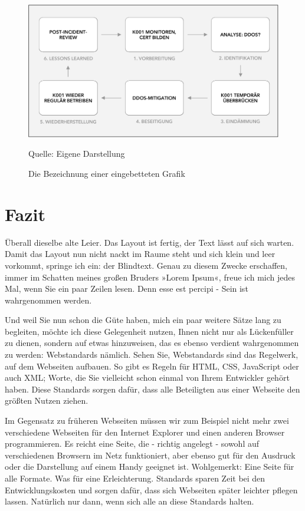 \documentclass[ngerman, 11pt, a4paper]{article}
\renewcommand{\footnotesize}{\linespread{1}\fontsize{10pt}{12pt}\selectfont}
\renewcommand{\footnotesize}{\linespread{1}\fontsize{10pt}{12pt}\selectfont}
\newcommand{\source}[1]{\caption*{\footnotesize Quelle: {#1}} }
\begin{document}
\begin{figure}[H]
\centering
\caption{Die Bezeichnung einer eingebetteten Grafik}
\label{fig:chasm}
\includegraphics[width=\textwidth]{graphic}
\source{Eigene Darstellung}
\end{figure} 

\section{Fazit}

Überall dieselbe alte Leier. Das Layout ist fertig, der Text lässt auf sich warten. Damit das Layout nun nicht nackt im Raume steht und sich klein und leer vorkommt, springe ich ein: der Blindtext. Genau zu diesem Zwecke erschaffen, immer im Schatten meines großen Bruders »Lorem Ipsum«, freue ich mich jedes Mal, wenn Sie ein paar Zeilen lesen. Denn esse est percipi - Sein ist wahrgenommen werden.

Und weil Sie nun schon die Güte haben, mich ein paar weitere Sätze lang zu begleiten, möchte ich diese Gelegenheit nutzen, Ihnen nicht nur als Lückenfüller zu dienen, sondern auf etwas hinzuweisen, das es ebenso verdient wahrgenommen zu werden: Webstandards nämlich. Sehen Sie, Webstandards sind das Regelwerk, auf dem Webseiten aufbauen. So gibt es Regeln für HTML, CSS, JavaScript oder auch XML; Worte, die Sie vielleicht schon einmal von Ihrem Entwickler gehört haben. Diese Standards sorgen dafür, dass alle Beteiligten aus einer Webseite den größten Nutzen ziehen.

Im Gegensatz zu früheren Webseiten müssen wir zum Beispiel nicht mehr zwei verschiedene Webseiten für den Internet Explorer und einen anderen Browser programmieren. Es reicht eine Seite, die - richtig angelegt - sowohl auf verschiedenen Browsern im Netz funktioniert, aber ebenso gut für den Ausdruck oder die Darstellung auf einem Handy geeignet ist. Wohlgemerkt: Eine Seite für alle Formate. Was für eine Erleichterung. Standards sparen Zeit bei den Entwicklungskosten und sorgen dafür, dass sich Webseiten später leichter pflegen lassen. Natürlich nur dann, wenn sich alle an diese Standards halten.
\end{document}
